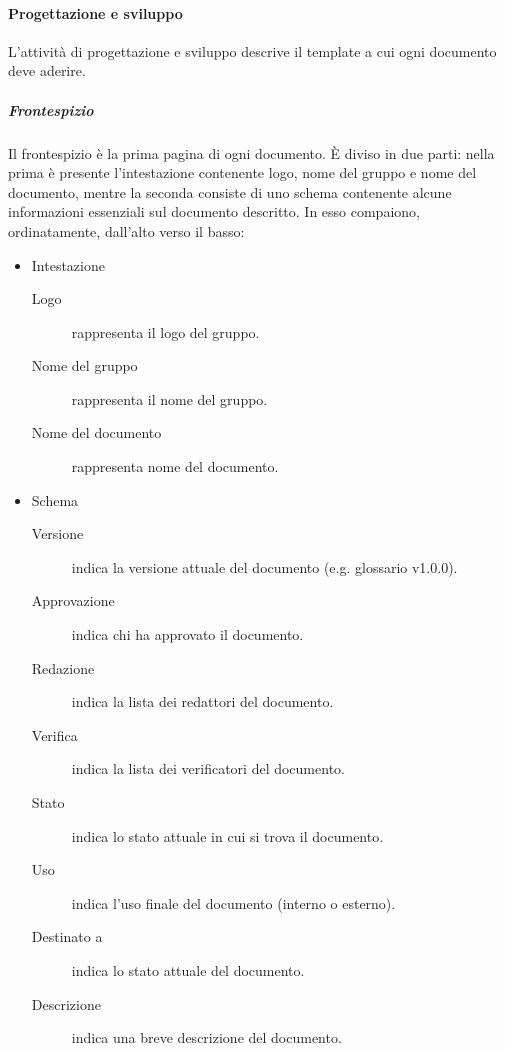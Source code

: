 \documentclass[../../norme-di-progetto.tex]{subfiles}
\begin{document}
\paragraph{Progettazione e sviluppo}%
\label{par:progettazione_e_sviluppo}

L'attività di progettazione e sviluppo descrive il template a cui ogni documento deve aderire.

\subparagraph{Frontespizio}%
\label{subp:frontespizio}
Il frontespizio è la prima pagina di ogni documento. È diviso in due parti: nella prima è presente l'intestazione contenente logo, nome del gruppo e nome del documento, mentre la seconda consiste di uno schema contenente alcune informazioni essenziali sul documento descritto. In esso compaiono, ordinatamente, dall'alto verso il basso:

\begin{itemize}
  \item Intestazione
        \begin{description}
          \item [Logo] rappresenta il logo del gruppo.
          \item [Nome del gruppo] rappresenta il nome del gruppo.
          \item [Nome del documento] rappresenta nome del documento.
        \end{description}
  \item Schema
        \begin{description}
          \item [Versione] indica la versione attuale del documento (e.g\@. glossario v1.0.0).
          \item [Approvazione] indica chi ha approvato il documento.
          \item [Redazione] indica la lista dei redattori del documento.
          \item [Verifica] indica la lista dei verificatori del documento.
          \item [Stato] indica lo stato attuale in cui si trova il documento.
          \item [Uso] indica l'uso finale del documento (interno o esterno).
          \item [Destinato a] indica lo stato attuale del documento.
          \item [Descrizione] indica una breve descrizione del documento.
        \end{description}
\end{itemize}
\end{document}
